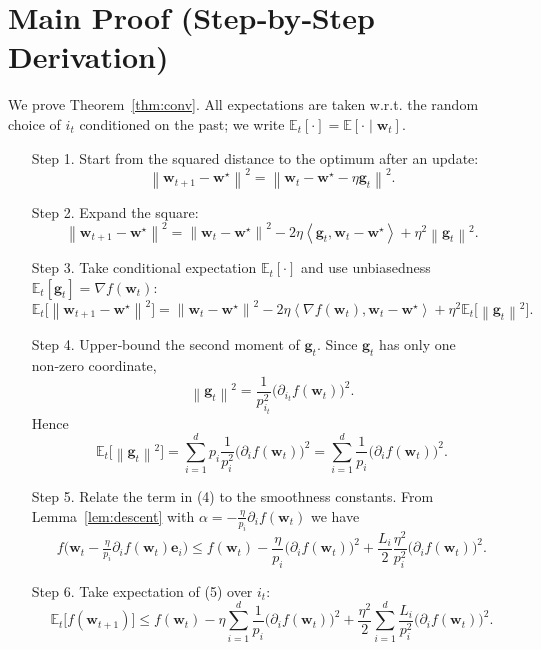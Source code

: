 \documentclass{article}
\newcommand{\E}{\mathbb{E}}
\newcommand{\norm}[1]{\left\lVert #1 \right\rVert}
\newcommand{\ip}[2]{\left\langle #1,#2 \right\rangle}
\newcommand{\e}{\mathbf{e}}
\begin{document}
\section*{Main Proof (Step‑by‑Step Derivation)}
We prove Theorem~\ref{thm:conv}. All expectations are taken w.r.t. the random choice of $i_t$ conditioned on the past; we write $\E_t[\cdot]=\E[\cdot\mid\mathbf w_t]$.

\begin{enumerate}
\item[Step 1.]  Start from the squared distance to the optimum after an update:
\[
\norm{\mathbf w_{t+1}-\mathbf w^\star}^{2}
= \norm{\mathbf w_t-\mathbf w^\star-\eta\mathbf g_t}^{2}.
\tag{1}
\]

\item[Step 2.]  Expand the square:
\[
\norm{\mathbf w_{t+1}-\mathbf w^\star}^{2}
= \norm{\mathbf w_t-\mathbf w^\star}^{2}
-2\eta\ip{\mathbf g_t}{\mathbf w_t-\mathbf w^\star}
+\eta^{2}\norm{\mathbf g_t}^{2}.
\tag{2}
\]

\item[Step 3.]  Take conditional expectation $\E_t[\cdot]$ and use unbiasedness
$\E_t[\mathbf g_t]=\nabla f(\mathbf w_t)$:
\[
\E_t\!\bigl[\norm{\mathbf w_{t+1}-\mathbf w^\star}^{2}\bigr]
= \norm{\mathbf w_t-\mathbf w^\star}^{2}
-2\eta\ip{\nabla f(\mathbf w_t)}{\mathbf w_t-\mathbf w^\star}
+\eta^{2}\E_t\!\bigl[\norm{\mathbf g_t}^{2}\bigr].
\tag{3}
\]

\item[Step 4.]  Upper‑bound the second moment of $\mathbf g_t$.
Since $\mathbf g_t$ has only one non‑zero coordinate,
\[
\norm{\mathbf g_t}^{2}= \frac{1}{p_{i_t}^{2}}\bigl(\partial_{i_t}f(\mathbf w_t)\bigr)^{2}.
\]
Hence
\[
\E_t\!\bigl[\norm{\mathbf g_t}^{2}\bigr]
= \sum_{i=1}^{d}p_i\frac{1}{p_i^{2}}\bigl(\partial_i f(\mathbf w_t)\bigr)^{2}
= \sum_{i=1}^{d}\frac{1}{p_i}\bigl(\partial_i f(\mathbf w_t)\bigr)^{2}.
\tag{4}
\]

\item[Step 5.]  Relate the term in (4) to the smoothness constants.
From Lemma~\ref{lem:descent} with $\alpha=-\frac{\eta}{p_i}\partial_i f(\mathbf w_t)$ we have
\[
f\!\bigl(\mathbf w_t-\tfrac{\eta}{p_i}\partial_i f(\mathbf w_t)\e_i\bigr)
\le f(\mathbf w_t)-\frac{\eta}{p_i}\bigl(\partial_i f(\mathbf w_t)\bigr)^{2}
+\frac{L_i}{2}\frac{\eta^{2}}{p_i^{2}}\bigl(\partial_i f(\mathbf w_t)\bigr)^{2}.
\tag{5}
\]

\item[Step 6.]  Take expectation of (5) over $i_t$:
\[
\E_t\!\bigl[f(\mathbf w_{t+1})\bigr]
\le f(\mathbf w_t)-\eta\sum_{i=1}^{d}\frac{1}{p_i}\bigl(\partial_i f(\mathbf w_t)\bigr)^{2}
+\frac{\eta^{2}}{2}\sum_{i=1}^{d}\frac{L_i}{p_i^{2}}\bigl(\partial_i f(\mathbf w_t)\bigr)^{2}.
\tag{6}
\]


\end{enumerate}
\end{document}
